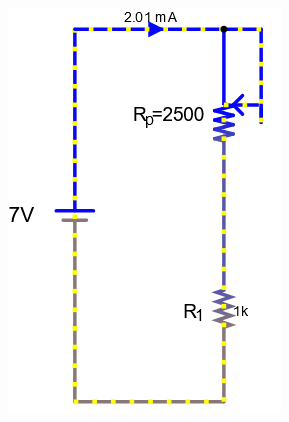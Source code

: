\documentclass[a4paper]{article}
\begin{document}
\begin{figure}[H]
\begin{subfigure}{0.333\textwidth}
        \includegraphics[width=.9\linewidth]{amp7}
    \end{subfigure}
    \begin{subfigure}{0.333\textwidth}

\end{subfigure}
\end{figure}
\end{document}
